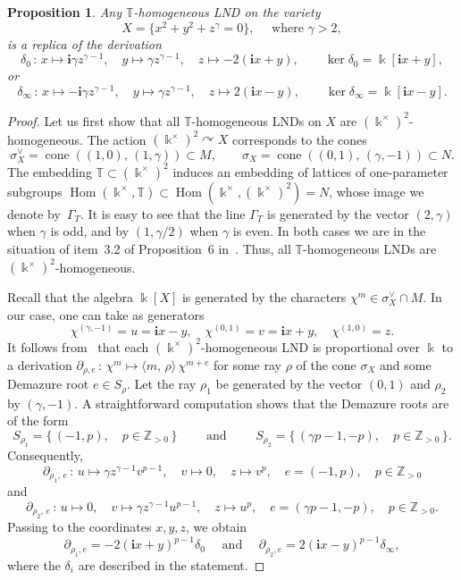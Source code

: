 \documentclass[a4paper,reqno,12pt]{amsart}
\theoremstyle{plain}
\newtheorem{proposition}[theorem]{Proposition}
\theoremstyle{definition}
\theoremstyle{plain}
\theoremstyle{remark}
\DeclareMathOperator{\Hom}{Hom}
\newcommand{\TT}{\mathbb{T}}
\newcommand{\ZZ}{\mathbb Z}
\DeclareMathOperator{\cone}{cone}
\newcommand{\lmt}{\longmapsto}
\newcommand{\ii}{\mathbf{i}}
\begin{document}
\begin{proposition}\label{PropHomCaseGamma}
    Any ${\TT}$-homogeneous LND on the variety $$X=\{x^2+y^2+z^\gamma=0\},\quad\mbox{ where $\gamma>2$},$$ is a replica of the derivation
    \begin{equation*}
        \delta_{0}\,\colon\,x\longmapsto \ii\gamma z^{\gamma-1},\quad y\longmapsto \gamma z^{\gamma-1},\quad z\longmapsto -2(\ii x+y),\qquad\ker\delta_0=\Bbbk[\ii x+y],
   \end{equation*}
   or
   $$
    \delta_{\infty}\,\colon\,x\longmapsto -\ii\gamma z^{\gamma-1},\quad y\longmapsto \gamma z^{\gamma-1},\quad z\longmapsto 2(\ii x-y),\qquad\ker\delta_\infty=\Bbbk[\ii x-y].
   $$
\end{proposition}
\begin{proof}
    Let us first show that all ${\TT}$-homogeneous LNDs on $X$ are $(\Bbbk^\times)^2$-homogeneous. The action $(\Bbbk^\times)^2\curvearrowright X$ corresponds to the cones $$\sigma_X^\vee=\cone((1,0),\,(1,\gamma))\subset M, \qquad \sigma_X=\cone((0,1),\, (\gamma, -1))\subset N.$$
    The embedding ${\TT}\subset(\Bbbk^\times)^2$ induces an embedding of lattices of one-parameter subgroups $\Hom(\Bbbk^\times, {\TT})\subset \Hom(\Bbbk^\times, (\Bbbk^\times)^2)=N$, whose image we denote by~$\Gamma_T$. It is easy to see that the line $\Gamma_T$ is generated by the vector $(2,\gamma)$ when $\gamma$ is odd, and by $(1, \gamma/2)$ when $\gamma$ is even. In both cases we are in the situation of item~3.2 of Proposition~6 in~\cite{Kotenkova}. Thus, all ${\TT}$-homogeneous LNDs are $(\Bbbk^\times)^2$-homogeneous.

     Recall that the algebra $\Bbbk[X]$ is generated by the characters $\chi^m\in\sigma_X^\vee\cap M$. In our case, one can take as generators $$\chi^{(\gamma,-1)}=u=\ii x-y, \quad\chi^{(0,1)}=v=\ii x+y, \quad\chi^{(1,0)}=z.$$ It follows from~\cite[Theorem~2.7]{Liendo} that each $(\Bbbk^\times)^2$-homogeneous LND is proportional over $\Bbbk$ to a derivation $\partial_{\rho, e}\,\colon\, \chi^m\longmapsto\langle m,\,\rho\rangle\,\chi^{m+e}$ for some ray $\rho$ of the cone $\sigma_X$ and some Demazure root $e\in S_\rho$. Let the ray $\rho_1$ be generated by the vector $(0,1)$ and $\rho_2$ by $(\gamma, -1)$. A straightforward computation shows that the Demazure roots are of the form
     $$
     S_{\rho_1}=\{\, (-1, p),\quad p\in\ZZ_{>0}\,\}\qquad\mbox{ and }\qquad S_{\rho_2}=\{\, (\gamma p-1, -p),\quad p\in\ZZ_{>0}\,\}.
     $$
     Consequently,
     $$\partial_{\rho_1,\, e}\,\colon\,u\lmt\gamma z^{\gamma-1}v^{p-1},\quad v\lmt0,\quad z\lmt v^p,\quad e=(-1, p),\quad p\in\ZZ_{>0}$$
     and
     $$\partial_{\rho_2,\, e}\,\colon\,u\lmt0,\quad v\lmt \gamma z^{\gamma-1}u^{p-1},\quad z\lmt u^p,\quad e=(\gamma p-1, -p),\quad p\in\ZZ_{>0}.$$
     Passing to the coordinates $x,y,z$, we obtain $$\partial_{\rho_1,e}=-2(\ii x+y)^{p-1}\delta_0\quad\mbox{ and }\quad \partial_{\rho_2, e}=2(\ii x-y)^{p-1}\delta_\infty,$$ where the $\delta_i$ are described in the statement.


\end{proof}
\end{document}
